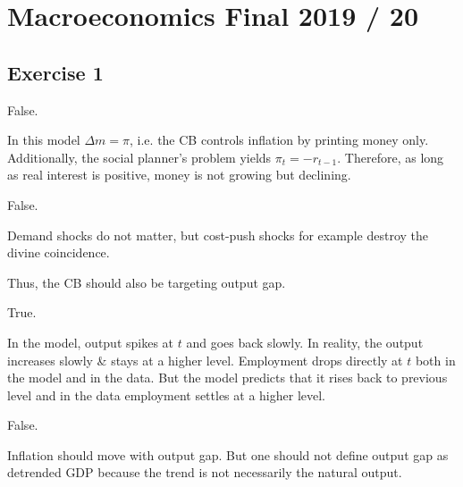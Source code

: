 \section{Macroeconomics Final 2019 / 20}

{
\subsection*{Exercise 1}

\begin{enumerate}[label=(\alph*)]
{\item 
False.

In this model $\Delta m=\pi$, i.e. the CB controls inflation by printing money only. Additionally, the social planner's problem yields $\pi_{t}=-r_{t-1}$. Therefore, as long as real interest is positive, money is not growing but declining.
}
{
\item 
False.

Demand shocks do not matter, but cost-push shocks for example destroy the divine coincidence.

Thus, the CB should also be targeting output gap.
}
{
\item 
True.

In the model, output spikes at $t$ and goes back slowly. In reality, the output increases slowly \& stays at a higher level. Employment drops directly at $t$ both in the model and in the data. But the model predicts that it rises back to previous level and in the data employment settles at a higher level.
}
{
\item 
False.

Inflation should move with output gap. But one should not define output gap as detrended GDP because the trend is not necessarily the natural output.
}
\end{enumerate}
}
\newpage
